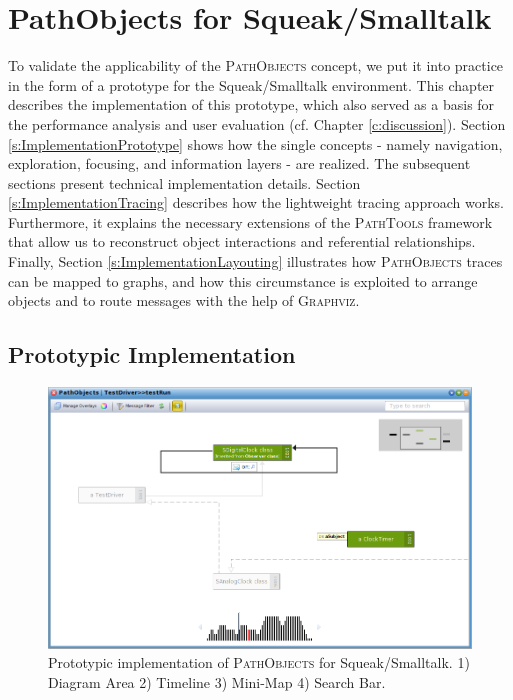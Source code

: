 \chapter{PathObjects for Squeak/Smalltalk}
\label{c:implementation}
To validate the applicability of the \textsc{PathObjects} concept, we put it into practice in the form of a prototype for the Squeak/Smalltalk environment.
This chapter describes the implementation of this prototype, which also served as a basis for the performance analysis and user evaluation (cf. Chapter \ref{c:discussion}).
Section \ref{s:ImplementationPrototype} shows how the single concepts - namely navigation, exploration, focusing, and information layers - are realized.
The subsequent sections present technical implementation details.
Section \ref{s:ImplementationTracing} describes how the lightweight tracing approach works.
Furthermore, it explains the necessary extensions of the \textsc{PathTools} framework that allow us to reconstruct object interactions and referential relationships.
Finally, Section \ref{s:ImplementationLayouting} illustrates how \textsc{PathObjects} traces can be mapped to graphs, and how this circumstance is exploited to arrange objects and to route messages with the help of \textsc{Graphviz}.

\section[Prototypic Implementation]{Prototypic Implementation%
}
\label{s:ImplementationPrototype}

\begin{figure}
	\centering
	\includegraphics[width=1\textwidth]{../images/04-ImplMainWindow}
	\caption[PathObjects for Squeak/Smalltalk]{Prototypic implementation of \textsc{PathObjects} for Squeak/Smalltalk. 1) Diagram Area 2) Timeline 3) Mini-Map 4) Search Bar.}
	\label{fig:ImplementationMainWindow}
\end{figure}


